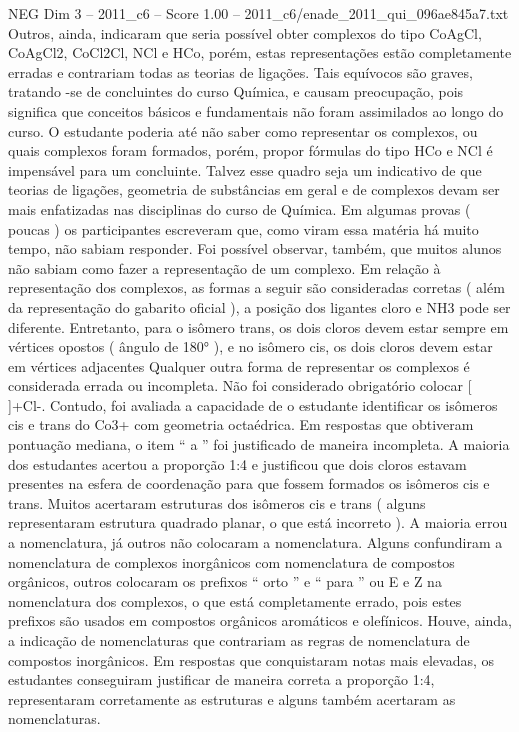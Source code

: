 \begin{textsample}{NEG Dim 3 – 2011\_c6 – Score 1.00 – 2011\_c6/enade\_2011\_qui\_096ae845a7.txt}
Outros, ainda, indicaram que seria possível obter complexos do tipo CoAgCl, CoAgCl2, CoCl2Cl, NCl e HCo, porém, estas representações estão completamente erradas e contrariam todas as teorias de ligações.
Tais equívocos são graves, tratando -se de concluintes do curso Química, e causam preocupação, pois significa que conceitos básicos e fundamentais não foram assimilados ao longo do curso.
O estudante poderia até não saber como representar os complexos, ou quais complexos foram formados, porém, propor fórmulas do tipo HCo e NCl é impensável para um concluinte.
Talvez esse quadro seja um indicativo de que teorias de ligações, geometria de substâncias em geral e de complexos devam ser mais enfatizadas nas disciplinas do curso de Química.
Em algumas provas ( poucas ) os participantes escreveram que, como viram essa matéria há muito tempo, não sabiam responder.
Foi possível observar, também, que muitos alunos não sabiam como fazer a representação de um complexo.
Em relação à representação dos complexos, as formas a seguir são consideradas corretas ( além da representação do gabarito oficial ), a posição dos ligantes cloro e NH3 pode ser diferente.
Entretanto, para o isômero trans, os dois cloros devem estar sempre em vértices opostos ( ângulo de 180{\EmojiFont °} ), e no isômero cis, os dois cloros devem estar em vértices adjacentes Qualquer outra forma de representar os complexos é considerada errada ou incompleta.
Não foi considerado obrigatório colocar [ ]+Cl-.
Contudo, foi avaliada a capacidade de o estudante identificar os isômeros cis e trans do Co3+ com geometria octaédrica.
Em respostas que obtiveram pontuação mediana, o item “ a ” foi justificado de maneira incompleta.
A maioria dos estudantes acertou a proporção 1:4 e justificou que dois cloros estavam presentes na esfera de coordenação para que fossem formados os isômeros cis e trans.
Muitos acertaram estruturas dos isômeros cis e trans ( alguns representaram estrutura quadrado planar, o que está incorreto ).
A maioria errou a nomenclatura, já outros não colocaram a nomenclatura.
Alguns confundiram a nomenclatura de complexos inorgânicos com nomenclatura de compostos orgânicos, outros colocaram os prefixos “ orto ” e “ para ” ou E e Z na nomenclatura dos complexos, o que está completamente errado, pois estes prefixos são usados em compostos orgânicos aromáticos e olefínicos.
Houve, ainda, a indicação de nomenclaturas que contrariam as regras de nomenclatura de compostos inorgânicos.
Em respostas que conquistaram notas mais elevadas, os estudantes conseguiram justificar de maneira correta a proporção 1:4, representaram corretamente as estruturas e alguns também acertaram as nomenclaturas.

\end{textsample}
